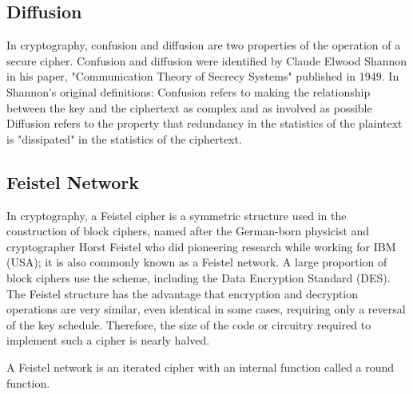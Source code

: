 \subsection{Diffusion}
In cryptography, confusion and diffusion are two properties of the operation of a secure cipher.
Confusion and diffusion were identified by Claude Elwood Shannon in his paper, "Communication Theory of Secrecy Systems" published in 1949. In Shannon's original definitions:
Confusion refers to making the relationship between the key and the ciphertext as complex and as involved as possible
Diffusion refers to the property that redundancy in the statistics of the plaintext is "dissipated" in the statistics of the ciphertext.

\subsection{Feistel Network}
In cryptography, a Feistel cipher is a symmetric structure used in the construction of block ciphers, named after the German-born physicist and cryptographer Horst Feistel who did pioneering research while working for IBM (USA); it is also commonly known as a Feistel network. A large proportion of block ciphers use the scheme, including the Data Encryption Standard (DES). The Feistel structure has the advantage that encryption and decryption operations are very similar, even identical in some cases, requiring only a reversal of the key schedule. Therefore, the size of the code or circuitry required to implement such a cipher is nearly halved.

A Feistel network is an iterated cipher with an internal function called a round function.

